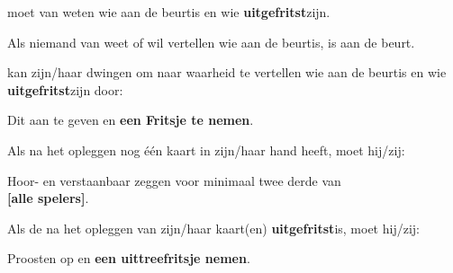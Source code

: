 
\newpage
{}
\label{sec:beurten_en_zetten_einde}


\vervolgLijst{}
    \item \EenSpeler moet van \alleSpelers weten wie aan de beurt\footnotemark[1] is en wie \textbf{uitgefritst}\footnotemark[2] zijn.
\eindLijst{}

\vervolgLijst{}
    \item Als niemand van \alleSpelers weet of wil vertellen wie aan de beurt\footnotemark[1] is, is \Frits aan de beurt\footnotemark[1].
\eindLijst{}

\vervolgLijst{}
    \item \EenSpeler kan zijn/haar \medeSpelers dwingen om naar waarheid te vertellen wie aan de beurt\footnotemark[1] is en wie \textbf{uitgefritst}\footnotemark[2] zijn door:
    \puntLijst{}
        \item Dit aan te geven en \textbf{een Fritsje te nemen}\footnotemark[3].
    \eindPuntLijst{}
\eindLijst{}


\vervolgLijst{}
    \item Als \eenSpeler na het opleggen nog \'e\'en kaart in zijn/haar hand heeft, moet hij/zij:
    \puntLijst{}
        \item Hoor- en verstaanbaar  zeggen voor minimaal twee derde van \\ \textbf{[alle spelers]}.
    \eindPuntLijst{}
    \label{regel:laatste_frits_1}
\eindLijst{}

\vervolgLijst{}
    \item Als de \huidigeSpeler na het opleggen van zijn/haar kaart(en) \textbf{uitgefritst}\footnotemark[4] is, moet hij/zij:
    \puntLijst{}
        \item Proosten op  en \textbf{een uittreefritsje nemen}\footnotemark[3].
    \eindPuntLijst{}
    \label{regel:laatste_frits_2}
\eindLijst{}

